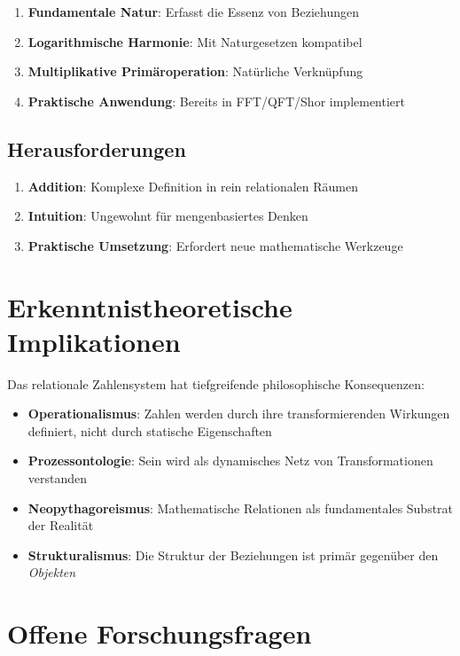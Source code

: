 \documentclass[11pt,a4paper]{article}
\begin{document}
	\begin{enumerate}
		\item \textbf{Fundamentale Natur}: Erfasst die Essenz von Beziehungen
		\item \textbf{Logarithmische Harmonie}: Mit Naturgesetzen kompatibel
		\item \textbf{Multiplikative Primäroperation}: Natürliche Verknüpfung
		\item \textbf{Praktische Anwendung}: Bereits in FFT/QFT/Shor implementiert
	\end{enumerate}
	
	\subsection{Herausforderungen}
	
	\begin{enumerate}
		\item \textbf{Addition}: Komplexe Definition in rein relationalen Räumen
		\item \textbf{Intuition}: Ungewohnt für mengenbasiertes Denken
		\item \textbf{Praktische Umsetzung}: Erfordert neue mathematische Werkzeuge
	\end{enumerate}
	
	\section{Erkenntnistheoretische Implikationen}
	
	Das relationale Zahlensystem hat tiefgreifende philosophische Konsequenzen:
	
	\begin{itemize}
		\item \textbf{Operationalismus}: Zahlen werden durch ihre transformierenden Wirkungen definiert, nicht durch statische Eigenschaften
		\item \textbf{Prozessontologie}: Sein wird als dynamisches Netz von Transformationen verstanden
		\item \textbf{Neopythagoreismus}: Mathematische Relationen als fundamentales Substrat der Realität
		\item \textbf{Strukturalismus}: Die Struktur der Beziehungen ist primär gegenüber den \emph{Objekten}
	\end{itemize}
	
	\section{Offene Forschungsfragen}
	
\end{document}
